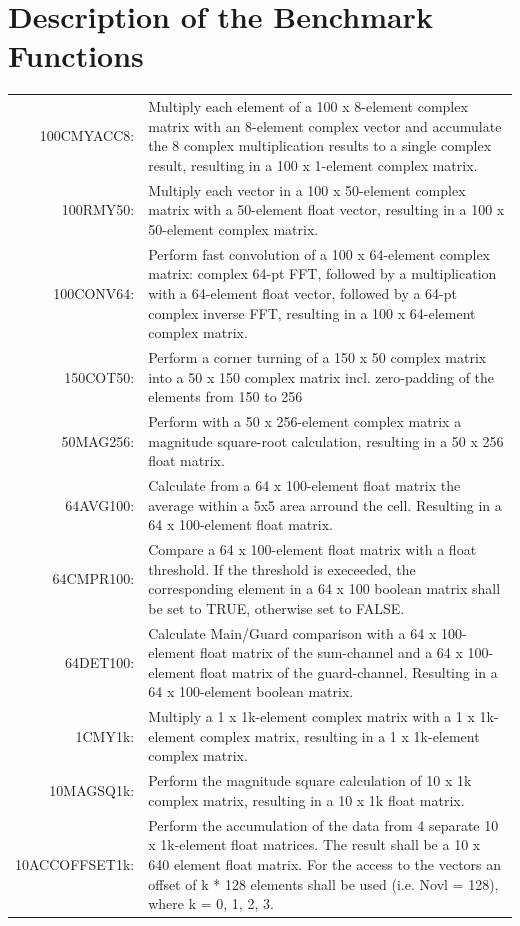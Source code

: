 \chapter{Description of the Benchmark Functions}
\label{description:benchmark}
\begin{longtable}{rp{120mm}}
	\hypertarget{benchmarks}{100CMYACC8:}& Multiply each element of a 100 x 8-element complex matrix with an 8-element complex vector and accumulate the 8 complex multiplication results to a single complex result, resulting in a 100 x 1-element complex matrix. \\[0.2cm]
	100RMY50: & Multiply each vector in a 100 x 50-element complex matrix with a 50-element float vector, resulting in a 100 x 50-element complex matrix.\\[0.2cm]
	100CONV64: & Perform fast convolution of a 100 x 64-element complex matrix: complex 64-pt FFT, followed by a multiplication with a 64-element float vector, followed by a 64-pt complex inverse FFT, resulting in a 100 x 64-element complex matrix. \\[0.2cm]
	150COT50: & Perform a corner turning of a 150 x 50 complex matrix into a 50 x 150 complex matrix incl. zero-padding of the elements from 150 to 256\\ [0.2cm]
	50MAG256: & Perform with a 50 x 256-element complex matrix a magnitude square-root calculation, resulting in a 50 x 256 float matrix. \\[0.2cm]
	64AVG100: & Calculate from a 64 x 100-element float matrix the average within a 5x5 area arround the cell. Resulting in a 64 x 100-element float matrix. \\[0.2cm]
	64CMPR100: & Compare a 64 x 100-element float matrix with a float threshold. If  the threshold is execeeded, the corresponding element in a 64 x 100 boolean matrix shall be set to TRUE, otherwise set to FALSE. \\[0.2cm]
	64DET100: & Calculate Main/Guard comparison with a 64 x 100-element float matrix of the sum-channel and a 64 x 100-element float matrix of the guard-channel. Resulting in a 64 x 100-element boolean matrix. \\[0.2cm]
	1CMY1k: & Multiply a 1 x 1k-element complex matrix with a 1 x 1k-element complex matrix, resulting in a 1 x 1k-element complex matrix.\\[0.2cm]
	10MAGSQ1k: & Perform the magnitude square calculation of 10 x 1k complex matrix, resulting in a 10 x 1k float matrix. \\[0.2cm]
	10ACCOFFSET1k: & Perform the accumulation of the data from 4 separate 10 x 1k-element float matrices. The result shall be a 10 x 640 element float matrix. For the access to the vectors an offset of k * 128 elements shall be used (i.e. Novl = 128), where k = {0, 1, 2, 3}.\\[0.2cm]

\end{longtable}

